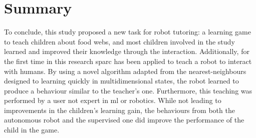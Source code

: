 



\section{Summary}

To conclude, this study proposed a new task for robot tutoring: a learning game to teach children about food webs, and most children involved in the study learned and improved their knowledge through the interaction. Additionally, for the first time in this research \gls{sparc} has been applied to teach a robot to interact with humans. By using a novel algorithm adapted from the nearest-neighbours designed to learning quickly in multidimensional states, the robot learned to produce a behaviour similar to the teacher's one. Furthermore, this teaching was performed by a user not expert in \gls{ml} or robotics. While not leading to improvements in the children's learning gain, the behaviours from both the autonomous robot and the supervised one did improve the performance of the child in the game. 

